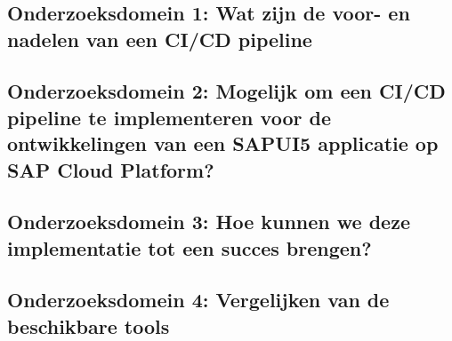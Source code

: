 
\chapter{}
\label{ch:methodologie}


\section{Onderzoeksdomein 1: Wat zijn de voor- en nadelen van een CI/CD pipeline}
\label{sec:onderzoeksdeel1}

\section{Onderzoeksdomein 2: Mogelijk om een CI/CD pipeline te implementeren voor de ontwikkelingen van een SAPUI5 applicatie op SAP Cloud Platform?}
\label{sec:onderzoeksdeel2}

\section{Onderzoeksdomein 3: Hoe kunnen we deze implementatie tot een succes brengen?}
\label{sec:onderzoeksdeel3}

\section{Onderzoeksdomein 4: Vergelijken van de beschikbare tools}
\label{sec:onderzoeksdeel4}


